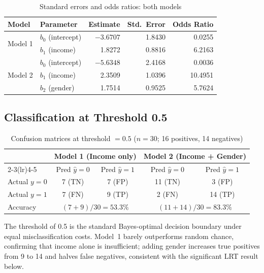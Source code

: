 \documentclass[12pt,a4paper]{article}
\begin{document}
\begin{table}[H]
\centering
\caption{Standard errors and odds ratios: both models}
\begin{tabular}{llrrr}
\toprule
Model & Parameter & Estimate & Std.\ Error & Odds Ratio \\
\midrule
\multirow{2}{*}{Model 1}
  & $b_0$ (intercept) & $-3.6707$ & 1.8430 &  0.0255 \\
  & $b_1$ (income)    &  1.8272   & 0.8816 &  6.2163 \\
\midrule
\multirow{3}{*}{Model 2}
  & $b_0$ (intercept) & $-5.6348$ & 2.4168 &  0.0036 \\
  & $b_1$ (income)    &  2.3509   & 1.0396 & 10.4951 \\
  & $b_2$ (gender)    &  1.7514   & 0.9525 &  5.7624 \\
\bottomrule
\end{tabular}
\end{table}

\subsection{Classification at Threshold 0.5}

\begin{table}[H]
\centering
\caption{Confusion matrices at threshold $= 0.5$ ($n=30$; 16 positives, 14 negatives)}
\begin{tabular}{lcccc}
\toprule
 & \multicolumn{2}{c}{Model 1 (Income only)} & \multicolumn{2}{c}{Model 2 (Income + Gender)} \\
\cmidrule(lr){2-3}\cmidrule(lr){4-5}
 & Pred $\hat{y}=0$ & Pred $\hat{y}=1$ & Pred $\hat{y}=0$ & Pred $\hat{y}=1$ \\
\midrule
Actual $y=0$ & 7 (TN) & 7 (FP) & 11 (TN) & 3 (FP) \\
Actual $y=1$ & 7 (FN) & 9 (TP) &  2 (FN) & 14 (TP) \\
\midrule
Accuracy & \multicolumn{2}{c}{$(7+9)/30 = 53.3\%$} & \multicolumn{2}{c}{$(11+14)/30 = 83.3\%$} \\
\bottomrule
\end{tabular}
\end{table}

The threshold of 0.5 is the standard Bayes-optimal decision boundary under equal
misclassification costs. Model~1 barely outperforms random chance, confirming that
income alone is insufficient; adding gender increases true positives from 9 to 14
and halves false negatives, consistent with the significant LRT result below.
\end{document}
